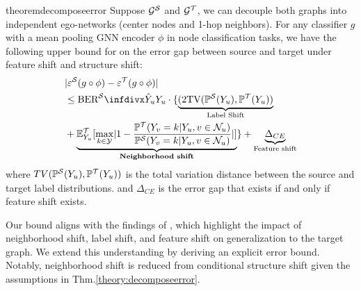 \begin{restatable}{theorem}{decomposeerror}
\label{theory:decomposeerror}
Suppose ${\mathcal{G}}^{{\mathcal{S}}}$ and ${\mathcal{G}}^{{\mathcal{T}}}$, we can decouple both graphs into independent ego-networks (center nodes and 1-hop neighbors).
For any classifier $g$ with a mean pooling GNN encoder $\phi$ in node classification tasks, we have the following upper bound for on the error gap between source and target under feature shift and structure shift: 
\begin{align*}
&\abs{\errors(g \circ \phi) - \errort(g \circ \phi)} \\ 
&\leq   
\balerrorrate{\predy_u}{\rvY_u}\cdot
    \cbrace{\underbrace{
    \rpar{2\text{TV}(\probs(\rvY_u), \probt(\rvY_u)}
    }_{\text{Label Shift}}
   \\
    &+\underbrace{\E_{Y_u}^\gT\spar{\max_{k\in \gY} \abs{1-\frac{\probt(Y_v=k|Y_u,v\in \neighbor_u)}{\probs(Y_v=k|Y_u,v\in \neighbor_u)}}}  }_{\textbf{Neighborhood shift}}}
    + \underbrace{\Delta_{CE}}_{\text{Feature shift}}
\end{align*}
where 
    $TV(\mathbb{P}^\mathcal{S}(Y_u), \mathbb{P}^\mathcal{T}(Y_u))$ %
    is the total variation distance between the source and target label distributions. %
    and 
    $\Delta_{CE}$ is the error gap that exists if and only if feature shift exists.
\end{restatable}


Our bound aligns with the findings of \citet{liu2024pairwise}, which highlight the impact of neighborhood shift, label shift, and feature shift on generalization to the target graph. We extend this understanding by deriving an explicit error bound. Notably, neighborhood shift is reduced from conditional structure shift given the assumptions  in Thm.\ref{theory:decomposeerror}.

